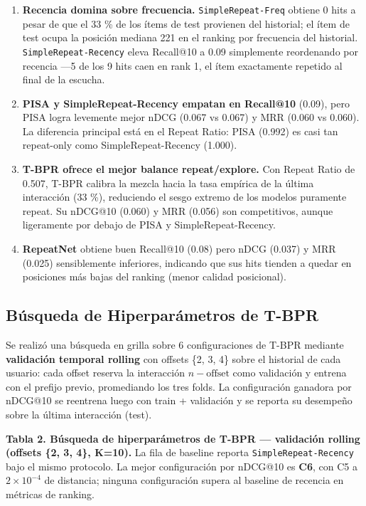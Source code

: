\documentclass{article}
\begin{document}
\begin{enumerate}
\def\labelenumi{\arabic{enumi}.}
\item
  \textbf{Recencia domina sobre frecuencia.} \texttt{SimpleRepeat-Freq} obtiene 0 hits a pesar de que el 33 \% de los ítems de test provienen del historial; el ítem de test ocupa la posición mediana 221 en el ranking por frecuencia del historial. \texttt{SimpleRepeat-Recency} eleva Recall@10 a 0.09 simplemente reordenando por recencia ---5 de los 9 hits caen en rank 1, el ítem exactamente repetido al final de la escucha.
\item
  \textbf{PISA y SimpleRepeat-Recency empatan en Recall@10} (0.09), pero PISA logra levemente mejor nDCG (0.067 vs 0.067) y MRR (0.060 vs 0.060). La diferencia principal está en el Repeat Ratio: PISA (0.992) es casi tan repeat-only como SimpleRepeat-Recency (1.000).
\item
  \textbf{T-BPR ofrece el mejor balance repeat/explore.} Con Repeat Ratio de 0.507, T-BPR calibra la mezcla hacia la tasa empírica de la última interacción (33 \%), reduciendo el sesgo extremo de los modelos puramente repeat. Su nDCG@10 (0.060) y MRR (0.056) son competitivos, aunque ligeramente por debajo de PISA y SimpleRepeat-Recency.
\item
  \textbf{RepeatNet} obtiene buen Recall@10 (0.08) pero nDCG (0.037) y MRR (0.025) sensiblemente inferiores, indicando que sus hits tienden a quedar en posiciones más bajas del ranking (menor calidad posicional).
\end{enumerate}

\subsection{Búsqueda de Hiperparámetros de T-BPR}\label{buxfasqueda-de-hiperparuxe1metros-de-t-bpr}

Se realizó una búsqueda en grilla sobre 6 configuraciones de T-BPR mediante \textbf{validación temporal rolling} con offsets \{2, 3, 4\} sobre el historial de cada usuario: cada offset reserva la interacción \(n-\text{offset}\) como validación y entrena con el prefijo previo, promediando los tres folds. La configuración ganadora por nDCG@10 se reentrena luego con train + validación y se reporta su desempeño sobre la última interacción (test).

\textbf{Tabla 2. Búsqueda de hiperparámetros de T-BPR --- validación rolling (offsets \{2, 3, 4\}, K=10).} La fila de baseline reporta \texttt{SimpleRepeat-Recency} bajo el mismo protocolo. La mejor configuración por nDCG@10 es \textbf{C6}, con C5 a \(2\times10^{-4}\) de distancia; ninguna configuración supera al baseline de recencia en métricas de ranking.
\end{document}
